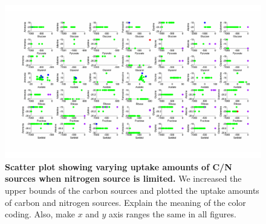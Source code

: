 \documentclass[12pt]{article}
\begin{document}
\clearpage
\begin{figure}[!ht]
\centerline{\includegraphics[width=8in]{Figures/NitrogenLimiting.pdf}}
\caption{\label{fig:NitrogenLimiting}\textbf{Scatter plot showing varying uptake amounts of C/N sources when nitrogen source is limited. }We  increased the upper bounds of the carbon sources and plotted the uptake amounts of carbon and nitrogen sources. {\color{red}Explain the meaning of the color coding. Also, make $x$ and $y$ axis ranges the same in all figures.}}
\end{figure}
\end{document}
